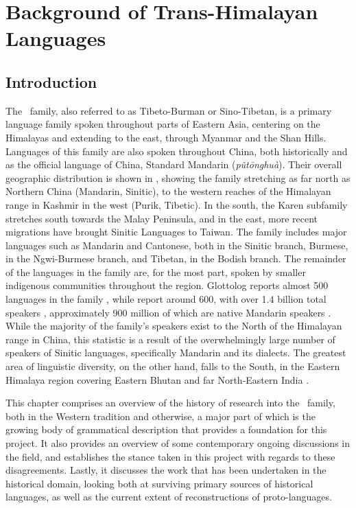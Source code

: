 \chapter{Background of Trans-Himalayan Languages}

\section{Introduction}
The \lfam\ family, also referred to as Tibeto-Burman or Sino-Tibetan, is a primary language family spoken throughout parts of Eastern Asia, centering on the Himalayas and extending to the east, through Myanmar and the Shan Hills. Languages of this family are also spoken throughout China, both historically and as the official language of China, Standard Mandarin (\textit{pǔtōnghuà}). Their overall geographic distribution is shown in , showing the family stretching as far north as Northern China (Mandarin, Sinitic), to the western reaches of the Himalayan range in Kashmir in the west (Purik, Tibetic). In the south, the Karen subfamily stretches south towards the Malay Peninsula, and in the east, more recent migrations have brought Sinitic Languages to Taiwan. The family includes major languages such as Mandarin and Cantonese, both in the Sinitic branch, Burmese, in the Ngwi-Burmese branch, and Tibetan, in the Bodish branch. The remainder of the languages in the family are, for the most part, spoken by smaller indigenous communities throughout the region. Glottolog reports almost 500 languages in the family \cite{glottolog}, while  report around 600, with over 1.4 billion total speakers \cite{ZhangH2020Baye}, approximately 900 million of which are native Mandarin speakers \cite{Ethnologue}. While the majority of the family's speakers exist to the North of the Himalayan range in China, this statistic is a result of the overwhelmingly large number of speakers of Sinitic languages, specifically Mandarin and its dialects. The greatest area of linguistic diversity, on the other hand, falls to the South, in the Eastern Himalaya region covering Eastern Bhutan and far North-Eastern India \cite{BlenchPost2013}.

This chapter comprises an overview of the history of research into the \lfam\ family, both in the Western tradition and otherwise, a major part of which is the growing body of grammatical description that provides a foundation for this project. It also provides an overview of some contemporary ongoing discussions in the field, and establishes the stance taken in this project with regards to these disagreements. Lastly, it discusses the work that has been undertaken in the historical domain, looking both at surviving primary sources of historical languages, as well as the current extent of reconstructions of proto-languages.

